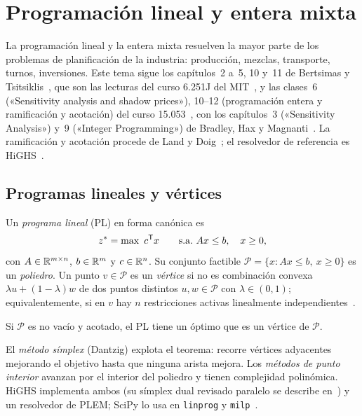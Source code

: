 \chapter{Programación lineal y entera mixta}
\label{tema:2}

La programación lineal y la entera mixta resuelven la mayor parte de los problemas de planificación de la industria: producción, mezclas, transporte, turnos, inversiones. Este tema sigue los capítulos~2 a~5, 10 y~11 de Bertsimas y Tsitsiklis~\cite{bt}, que son las lecturas del curso 6.251J del MIT~\cite{mit6251}, y las clases~6 («Sensitivity analysis and shadow prices»), 10--12 (programación entera y ramificación y acotación) del curso 15.053~\cite{mit15053}, con los capítulos~3 («Sensitivity Analysis») y~9 («Integer Programming») de Bradley, Hax y Magnanti~\cite{amp}. La ramificación y acotación procede de Land y Doig~\cite{landdoig}; el resolvedor de referencia es HiGHS~\cite{highs,hh}.

\section{Programas lineales y vértices}

\begin{definicion}\label{def:pl}
Un \emph{programa lineal} (PL) en forma canónica es
\[
z^{*}=\max\ c^{\mathsf{T}} x\qquad\text{s.a.}\  Ax\le b,\quad x\ge 0,
\]
con $A\in\mathbb{R}^{m\times n}$, $b\in\mathbb{R}^{m}$ y $c\in\mathbb{R}^{n}$. Su conjunto factible $\mathcal{P}=\{x: Ax\le b,\ x\ge 0\}$ es un \emph{poliedro}. Un punto $v\in\mathcal{P}$ es un \emph{vértice} si no es combinación convexa $\lambda u+(1-\lambda)w$ de dos puntos distintos $u,w\in\mathcal{P}$ con $\lambda\in(0,1)$; equivalentemente, si en $v$ hay $n$ restricciones activas linealmente independientes~\cite{bt}.
\end{definicion}

\begin{teorema}\label{teo:vertice}
Si $\mathcal{P}$ es no vacío y acotado, el PL tiene un óptimo que es un vértice de $\mathcal{P}$.
\end{teorema}

El \emph{método símplex} (Dantzig) explota el teorema: recorre vértices adyacentes mejorando el objetivo hasta que ninguna arista mejora. Los \emph{métodos de punto interior} avanzan por el interior del poliedro y tienen complejidad polinómica. HiGHS implementa ambos (su símplex dual revisado paralelo se describe en~\cite{hh}) y un resolvedor de PLEM; SciPy lo usa en \texttt{linprog} y \texttt{milp}~\cite{highs}.

